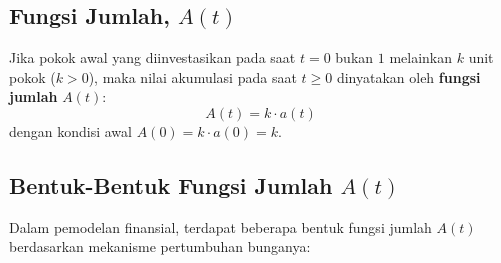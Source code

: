 \documentclass[11pt,a4paper]{article}
\begin{document}
\subsection{Fungsi Jumlah, $A(t)$}
\begin{definitionbox}
Jika pokok awal yang diinvestasikan pada saat $t = 0$ bukan $1$ melainkan $k$ unit pokok ($k > 0$), maka nilai akumulasi pada saat $t \ge 0$ dinyatakan oleh \textbf{fungsi jumlah} $A(t)$:
\begin{equation}
    A(t) = k \cdot a(t)
\end{equation}
dengan kondisi awal $A(0) = k \cdot a(0) = k$.
\end{definitionbox}

\subsection{Bentuk-Bentuk Fungsi Jumlah $A(t)$}
Dalam pemodelan finansial, terdapat beberapa bentuk fungsi jumlah $A(t)$ berdasarkan mekanisme pertumbuhan bunganya:
\end{document}

